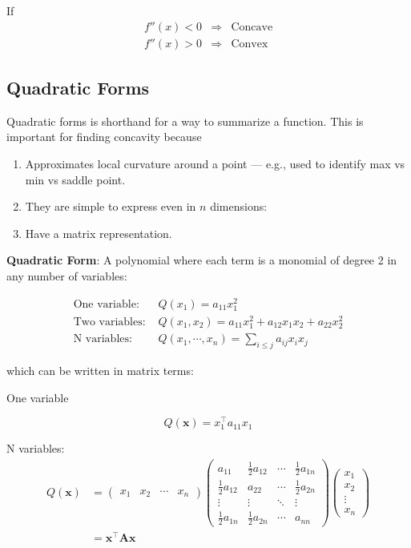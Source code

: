 \documentclass[
]{book}
\providecommand{\tightlist}{%
  \setlength{\itemsep}{0pt}\setlength{\parskip}{0pt}}
\theoremstyle{definition}
\theoremstyle{definition}
\theoremstyle{definition}
\theoremstyle{definition}
\theoremstyle{remark}
\begin{document}
If
\[\begin{array}{lll}
f''(x) < 0 & \Rightarrow & \text{Concave}\\
f''(x) > 0 & \Rightarrow & \text{Convex}
\end{array}\]

\hypertarget{quadratic-forms}{%
\subsection*{Quadratic Forms}\label{quadratic-forms}}

Quadratic forms is shorthand for a way to summarize a function. This is important for finding concavity because

\begin{enumerate}
\def\labelenumi{\arabic{enumi}.}
\tightlist
\item
  Approximates local curvature around a point --- e.g., used to
  identify max vs min vs saddle point.
\item
  They are simple to express even in \(n\) dimensions:
\item
  Have a matrix representation.
\end{enumerate}

\textbf{Quadratic Form}: A polynomial where each term is a monomial
of degree 2 in any number of variables:

\begin{align*}
\text{One variable: }& Q(x_1) = a_{11}x_1^2\\
\text{Two variables: }& Q(x_1,x_2) = a_{11}x_1^2 + a_{12}x_1x_2 + a_{22}x_2^2\\
\text{N variables: }& Q(x_1,\cdots,x_n)=\sum\limits_{i\le j} a_{ij}x_i x_j
\end{align*}

which can be written in matrix terms:

One variable

\[Q(\mathbf{x}) = x_1^\top a_{11} x_1\]

N variables:
\begin{align*}
Q(\mathbf{x}) &=\begin{pmatrix} x_1 & x_2 & \cdots & x_n \end{pmatrix}\begin{pmatrix}
a_{11}&\frac{1}{2}a_{12}&\cdots&\frac{1}{2}a_{1n}\\
\frac{1}{2}a_{12}&a_{22}&\cdots&\frac{1}{2}a_{2n}\\
\vdots&\vdots&\ddots&\vdots\\
\frac{1}{2}a_{1n}&\frac{1}{2}a_{2n}&\cdots&a_{nn}
\end{pmatrix}
\begin{pmatrix} x_1\\x_2\\\vdots\\x_n\end{pmatrix}\\
&= \mathbf{x}^\top\mathbf{Ax}
\end{align*}
\end{document}

